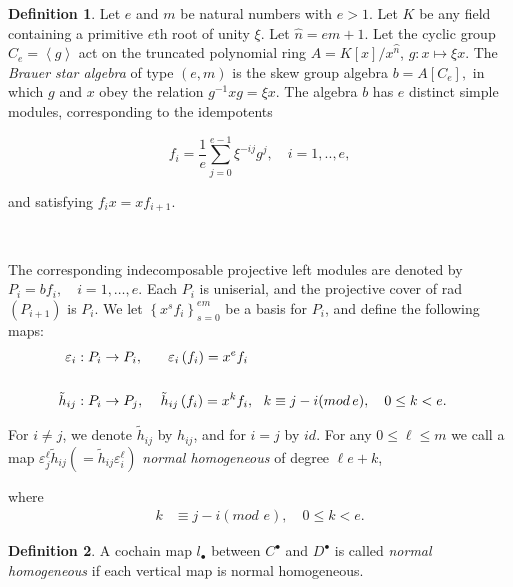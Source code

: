 \documentclass[11pt,english]{article}
\numberwithin{figure}{section}
\numberwithin{equation}{section}
\numberwithin{table}{section}
\theoremstyle{definition}
\newtheorem{defn}{Definition}[section]
\theoremstyle{remark}
\begin{document}
\noindent \begin{defn}Let $e$ and $m$ be natural numbers with $e>1$.
	Let $K$ be any field containing a primitive $e$th root of unity
	$\xi$. Let $\widehat{n}=em+1$. Let the cyclic group \({C_e} = \left\langle g \right\rangle \)
	act on the truncated polynomial ring $A=K[x]/x\hat{^{n}}$, $g:x\longmapsto\xi x$.
	The \textit{Brauer star algebra} of type $(e,m)$ is the skew group
	algebra $
	b=A[C_{e}],$
	in which $g$ and $x$ obey the relation
	$g^{-1}xg=\xi x.$
	The algebra $b$ has $e$ distinct simple modules, corresponding to
	the idempotents
	
	\[
	f_{i}=\frac{1}{e} \overset{e-1}{\underset{j=0}{\sum}}\xi^{-ij}g^{j},\quad i=1,..,e,
	\]
	
	
	\noindent and satisfying 
	$f_{i}x=xf_{i+1}.$
	
	~
	
	\noindent The corresponding indecomposable projective left modules
	are denoted by
	$P_{i}=bf_{i},\quad i=1,\ldots,e.$
	Each $P_{i}$ is uniserial, and the projective cover of
	rad$(P_{i+1})$ is $P_{i}$. We let $\left\{ x^{s}f_{i}\right\} _{s=0}^{em}$
	be a basis for $P_{i}$, and define the following maps:
	\begin{alignat*}{2}
		\varepsilon_{i}:P_{i} & \rightarrow P_{i}, & \varepsilon_{i}\left(f_{i}\right)=x^{e}f_{i}\\
		\\
		\tilde{h}_{ij}:P_{i} & \rightarrow P_{j},\thinspace\thinspace & \tilde{h}_{ij}\left(f_{i}\right)=x^{k}f_{i} & ,~~k\equiv j-i(mod\,e),\quad0\le k<e.
	\end{alignat*}
	
	
	\noindent For $i\neq j$, we denote $\tilde{h}_{ij}$ by $h_{ij}$,
	and for $i=j$ by $id$. For any $0\le\ensuremath{\ell}\leq m$
	we call a map $\varepsilon_{j}^{\ell}\tilde{h}_{ij}\left(=\tilde{h}_{ij}\varepsilon_{i}^{\ell}\right)$
	\textit{normal homogeneous} of degree $\ensuremath{\ell e+k}$, 
	
	\noindent where 
	\begin{align*}
		k & \equiv j-i\left(mod\text{~}e\right),\quad0\le k<e.
	\end{align*}
\end{defn}


\noindent \begin{defn}A cochain map $l_{\bullet}$ between $C^{\bullet}$ and $D^{\bullet}$
	is called \textit{normal homogeneous} if each vertical map is normal
	homogeneous.\end{defn}
\end{document}
